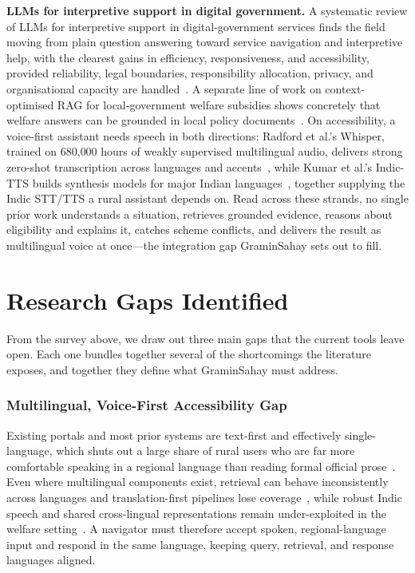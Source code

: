 \documentclass[conference]{IEEEtran}
\begin{document}
\textbf{LLMs for interpretive support in digital government.} A systematic review of LLMs for interpretive support in digital-government services finds the field moving from plain question answering toward service navigation and interpretive help, with the clearest gains in efficiency, responsiveness, and accessibility, provided reliability, legal boundaries, responsibility allocation, privacy, and organisational capacity are handled~\cite{zhang2026llm}. A separate line of work on context-optimised RAG for local-government welfare subsidies shows concretely that welfare answers can be grounded in local policy documents~\cite{kumar2025context}. On accessibility, a voice-first assistant needs speech in both directions: Radford et al.'s Whisper, trained on 680{,}000 hours of weakly supervised multilingual audio, delivers strong zero-shot transcription across languages and accents~\cite{radford2023whisper}, while Kumar et al.'s Indic-TTS builds synthesis models for major Indian languages~\cite{kumar2022indictts}, together supplying the Indic STT/TTS a rural assistant depends on. Read across these strands, no single prior work understands a situation, retrieves grounded evidence, reasons about eligibility and explains it, catches scheme conflicts, and delivers the result as multilingual voice at once---the integration gap GraminSahay sets out to fill.

\section{Research Gaps Identified}
\label{sec:gaps}
From the survey above, we draw out three main gaps that the current tools leave open. Each one bundles together several of the shortcomings the literature exposes, and together they define what GraminSahay must address.

\subsubsection{Multilingual, Voice-First Accessibility Gap}
Existing portals and most prior systems are text-first and effectively single-language, which shuts out a large share of rural users who are far more comfortable speaking in a regional language than reading formal official prose~\cite{zhang2026llm}. Even where multilingual components exist, retrieval can behave inconsistently across languages and translation-first pipelines lose coverage~\cite{qi2025consistency,ranaldi2026multilingual}, while robust Indic speech and shared cross-lingual representations remain under-exploited in the welfare setting~\cite{radford2023whisper,conneau2020xlmr,kakwani2020indicnlp}. A navigator must therefore accept spoken, regional-language input and respond in the same language, keeping query, retrieval, and response languages aligned.
\end{document}
